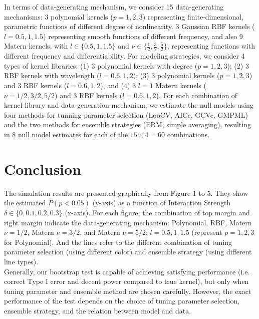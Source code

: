 \documentclass[11pt]{article}
\begin{document}
In terms of data-generating mechanism, we consider 15 data-generating mechanisms: 3 polynomial kernels ($p=1, 2, 3$) representing finite-dimensional, parametric functions of different degree of nonlinearity. 3 Gaussian RBF kernels ($l=0.5, 1, 1.5$) representing smooth functions of different frequency, and also 9 Matern kernels, with $l \in \{0.5, 1, 1.5\}$ and $\nu \in \{\frac{1}{2}, \frac{3}{2}, \frac{5}{2}\}$, representing functions with different frequency and differentiability. For modeling strategies, we consider 4 types of kernel libraries: (1) 3 polynomial kernels with degree ($p=1, 2, 3$); (2) 3 RBF kernels with wavelength ($l=0.6, 1, 2$); (3) 3 polynomial kernels ($p=1, 2, 3$) and 3 RBF kernels ($l=0.6, 1, 2$), and (4) 3 $l=1$ Matern kernels ($\nu=1/2, 3/2, 5/2$) and 3 RBF kernels ($l=0.6, 1, 2$). For each combination of kernel library and data-generation-mechanism, we estimate the null models using four methods for tunning-parameter selection (LooCV, AICc, GCVc, GMPML) and the two methods for ensemble strategies (ERM, simple averaging), resulting in 8 null model estimates for each of the $15 \times 4 = 60$ combinations.

\section{{\bf Conclusion}}
The simulation results are presented graphically from Figure 1 to 5. They show the estimated $\hat{P}(p<0.05)$ (y-axis) as a function of Interaction Strength $\delta \in \{0, 0.1, 0.2, 0.3\}$ (x-axis). For each figure, the combination of top margin and right margin indicate the data-generating mechanism: Polynomial, RBF, Matern $\nu=1/2$, Matern $\nu=3/2$, and Matern $\nu=5/2$; $l=0.5, 1, 1.5$ (represent $p=1, 2, 3$ for Polynomial). And the lines refer to the different combination of tuning parameter selection (using different color) and ensemble strategy (using different line types).\\

Generally, our bootstrap test is capable of achieving satisfying performance (i.e. correct Type I error and decent power compared to true kernel), but only when tuning parameter and ensemble method are chosen carefully. However, the exact performance of the test depends on the choice of tuning parameter selection, ensemble strategy, and the relation between model and data.\\
\end{document}
